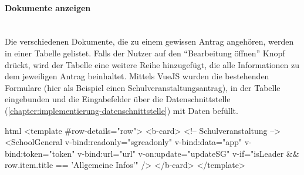 \paragraph{Dokumente anzeigen}
~\\
Die verschiedenen Dokumente, die zu einem gewissen Antrag angehören, werden in einer Tabelle gelistet. Falls der Nutzer auf den \enquote{Bearbeitung öffnen} Knopf drückt, wird der Tabelle eine weitere Reihe hinzugefügt, die alle Informationen zu dem jeweiligen Antrag beinhaltet. Mittels VueJS wurden die bestehenden Formulare (hier als Beispiel einen Schulveranstaltungsantrag), in der Tabelle eingebunden und die Eingabefelder über die Datenschnittstelle (\autoref{chapter:implementierung-datenschnittstelle}) mit Daten befüllt.
\begin{code}{html}
	<template #row-details="row">
        <b-card>
            <!-- Schulveranstaltung -->
            <SchoolGeneral
            v-bind:readonly="sgreadonly"
            v-bind:data="app"
            v-bind:token="token"
            v-bind:url="url"
            v-on:update="updateSG"
            v-if="isLeader && row.item.title == 'Allgemeine Infos'"
            />
		</b-card>
	</template>
\end{code}
	\label{list:docanz} ~\\

